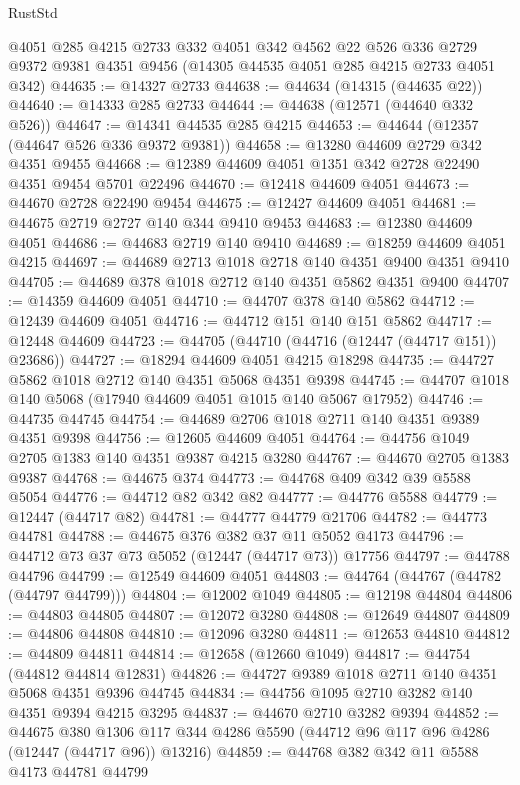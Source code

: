\begin{lexlean}{RustStd}
\begin{coremodule}
    @4051
    @285
    @4215
    @2733
    @332
    @4051
    @342
    @4562
    @22
    @526
    @336
    @2729
    @9372
    @9381
    @4351
    @9456
    (@14305 @44535 @4051 @285 @4215 @2733 @4051 @342)
@44635 := @14327 @2733
@44638 := @44634 (@14315 (@44635 @22))
@44640 := @14333 @285 @2733
@44644 := @44638 (@12571 (@44640 @332 @526))
@44647 := @14341 @44535 @285 @4215
@44653 := @44644 (@12357 (@44647 @526 @336 @9372 @9381))
@44658 := @13280 @44609 @2729 @342 @4351 @9455
@44668 := @12389 @44609 @4051 @1351 @342 @2728 @22490 @4351 @9454 @5701 @22496
@44670 := @12418 @44609 @4051
@44673 := @44670 @2728 @22490 @9454
@44675 := @12427 @44609 @4051
@44681 := @44675 @2719 @2727 @140 @344 @9410 @9453
@44683 := @12380 @44609 @4051
@44686 := @44683 @2719 @140 @9410
@44689 := @18259 @44609 @4051 @4215
@44697 := @44689 @2713 @1018 @2718 @140 @4351 @9400 @4351 @9410
@44705 := @44689 @378 @1018 @2712 @140 @4351 @5862 @4351 @9400
@44707 := @14359 @44609 @4051
@44710 := @44707 @378 @140 @5862
@44712 := @12439 @44609 @4051
@44716 := @44712 @151 @140 @151 @5862
@44717 := @12448 @44609
@44723 := @44705 (@44710 (@44716 (@12447 (@44717 @151)) @23686))
@44727 := @18294 @44609 @4051 @4215 @18298
@44735 := @44727 @5862 @1018 @2712 @140 @4351 @5068 @4351 @9398
@44745 := @44707 @1018 @140 @5068 (@17940 @44609 @4051 @1015 @140 @5067 @17952)
@44746 := @44735 @44745
@44754 := @44689 @2706 @1018 @2711 @140 @4351 @9389 @4351 @9398
@44756 := @12605 @44609 @4051
@44764 := @44756 @1049 @2705 @1383 @140 @4351 @9387 @4215 @3280
@44767 := @44670 @2705 @1383 @9387
@44768 := @44675 @374
@44773 := @44768 @409 @342 @39 @5588 @5054
@44776 := @44712 @82 @342 @82
@44777 := @44776 @5588
@44779 := @12447 (@44717 @82)
@44781 := @44777 @44779 @21706
@44782 := @44773 @44781
@44788 := @44675 @376 @382 @37 @11 @5052 @4173
@44796 := @44712 @73 @37 @73 @5052 (@12447 (@44717 @73)) @17756
@44797 := @44788 @44796
@44799 := @12549 @44609 @4051
@44803 := @44764 (@44767 (@44782 (@44797 @44799)))
@44804 := @12002 @1049
@44805 := @12198 @44804
@44806 := @44803 @44805
@44807 := @12072 @3280
@44808 := @12649 @44807
@44809 := @44806 @44808
@44810 := @12096 @3280
@44811 := @12653 @44810
@44812 := @44809 @44811
@44814 := @12658 (@12660 @1049)
@44817 := @44754 (@44812 @44814 @12831)
@44826 := @44727 @9389 @1018 @2711 @140 @4351 @5068 @4351 @9396 @44745
@44834 := @44756 @1095 @2710 @3282 @140 @4351 @9394 @4215 @3295
@44837 := @44670 @2710 @3282 @9394
@44852 := @44675
    @380
    @1306
    @117
    @344
    @4286
    @5590
    (@44712 @96 @117 @96 @4286 (@12447 (@44717 @96)) @13216)
@44859 := @44768 @382 @342 @11 @5588 @4173 @44781 @44799

\end{coremodule}
\end{lexlean}
